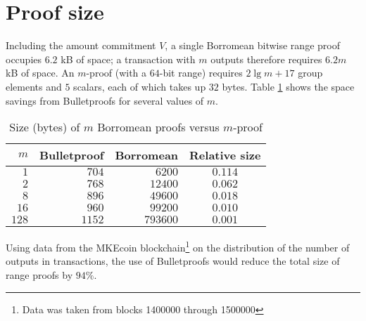 \documentclass{mrl}
\begin{document}
\section{Proof size}
Including the amount commitment $V$, a single Borromean bitwise range proof occupies $6.2$ kB of space; a transaction with $m$ outputs therefore requires $6.2m$ kB of space. An $m$-proof (with a $64$-bit range) requires $2\lg m + 17$ group elements and $5$ scalars, each of which takes up $32$ bytes. Table \ref{table:size} shows the space savings from Bulletproofs for several values of $m$.

\begin{table}[h]
\begin{center}
\begin{tabular}{r|rr|c}
$m$ & Bulletproof & Borromean & Relative size \\
\hline
$1$   & $704$  & $6200$   & $0.114$ \\
$2$   & $768$  & $12400$  & $0.062$ \\
$8$   & $896$  & $49600$  & $0.018$ \\
$16$  & $960$  & $99200$  & $0.010$ \\
$128$ & $1152$ & $793600$ & $0.001$
\end{tabular}
\caption{Size (bytes) of $m$ Borromean proofs versus $m$-proof}
\label{table:size}
\end{center}
\end{table}

Using data from the MKEcoin blockchain\footnote{Data was taken from blocks 1400000 through 1500000} on the distribution of the number of outputs in transactions, the use of Bulletproofs would reduce the total size of range proofs by $94\%$.



\end{document}
